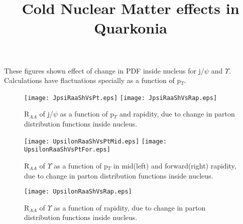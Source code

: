 \documentclass[aps,prc,preprint,superscriptaddress,showpacs,showkeys]{revtex4-1}
\begin{document}
\title{Cold Nuclear Matter effects in Quarkonia}
These figures shown effect of change in PDF inside nucleus for j/$\psi$ and $\Upsilon$. Calculations have 
flactuations specially as a function of p$_{T}$.

\begin{figure}
\texttt{[image: JpsiRaaShVsPt.eps]}
\texttt{[image: JpsiRaaShVsRap.eps]}
\caption{R$_{AA}$ of j/$\psi$ as a function of p$_{T}$ and rapidity, due to change in parton distribution functions inside nucleus.}
\label{fig:CNMJpsi}
\end{figure}






\begin{figure}
\texttt{[image: UpsilonRaaShVsPtMid.eps]}
\texttt{[image: UpsilonRaaShVsPtFor.eps]}
\caption{R$_{AA}$ of $\Upsilon$ as a function of p$_{T}$ in mid(left) and forward(right) rapidity, due to change in parton 
distribution functions inside nucleus.}
\label{fig:CNMUpsilon_Pt}
\end{figure}




\begin{figure}
\texttt{[image: UpsilonRaaShVsRap.eps]}
\caption{R$_{AA}$ of $\Upsilon$ as a function of rapidity, due to change in parton 
distribution functions inside nucleus.}
\label{fig:CNMUpsilon_Rap}
\end{figure}






\end{document}
